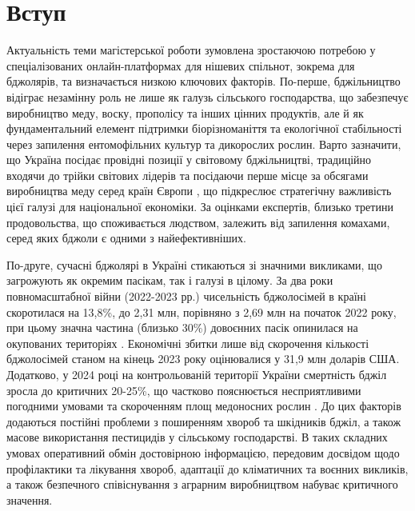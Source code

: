 \chapter*{Вступ}
\label{ch:introduction}

Актуальність теми магістерської роботи зумовлена зростаючою потребою у спеціалізованих онлайн-платформах для нішевих спільнот, зокрема для бджолярів, та визначається низкою ключових факторів. По-перше, бджільництво відіграє незамінну роль не лише як галузь сільського господарства, що забезпечує виробництво меду, воску, прополісу та інших цінних продуктів, але й як фундаментальний елемент підтримки біорізноманіття та екологічної стабільності через запилення ентомофільних культур та дикорослих рослин. Варто зазначити, що Україна посідає провідні позиції у світовому бджільництві, традиційно входячи до трійки світових лідерів та посідаючи перше місце за обсягами виробництва меду серед країн Європи \cite{unian2015honeyRank}, що підкреслює стратегічну важливість цієї галузі для національної економіки.
За оцінками експертів, близько третини продовольства, що споживається людством, залежить від запилення комахами, серед яких бджоли є одними з найефективніших.

По-друге, сучасні бджолярі в Україні стикаються зі значними викликами, що загрожують як окремим пасікам, так і галузі в цілому. За два роки повномасштабної війни (2022-2023 рр.) чисельність бджолосімей в країні скоротилася на 13,8\%, до 2,31 млн, порівняно з 2,69 млн на початок 2022 року, при цьому значна частина (близько 30\%) довоєнних пасік опинилася на окупованих територіях \cite{skilky2025beeMortality}. Економічні збитки лише від скорочення кількості бджолосімей станом на кінець 2023 року оцінювалися у 31,9 млн доларів США. Додатково, у 2024 році на контрольованій території України смертність бджіл зросла до критичних 20-25\%, що частково пояснюється несприятливими погодними умовами та скороченням площ медоносних рослин \cite{skilky2025beeMortality}. До цих факторів додаються постійні проблеми з поширенням хвороб та шкідників бджіл, а також масове використання пестицидів у сільському господарстві. В таких складних умовах оперативний обмін достовірною інформацією, передовим досвідом щодо профілактики та лікування хвороб, адаптації до кліматичних та воєнних викликів, а також безпечного співіснування з аграрним виробництвом набуває критичного значення.

